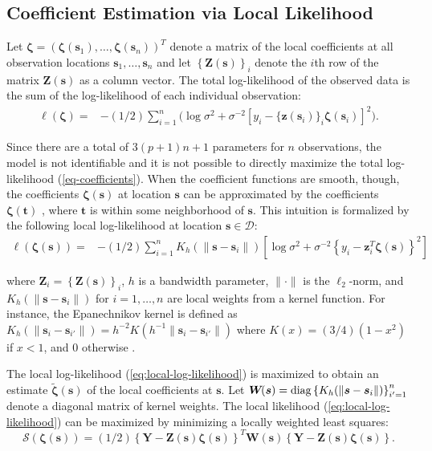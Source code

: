 \documentclass[authoryear,review, 12pt]{elsarticle}
\begin{document}
\subsection{Coefficient Estimation via Local Likelihood}




Let $\bm{\zeta}=\left(\bm{\zeta}(\bm{s}_{1}),\dots,\bm{\zeta}(\bm{s}_{n})\right)^{T}$
denote a matrix of the local coefficients at all observation locations
$\bm{s}_{1},\dots,\bm{s}_{n}$ and let $\left\{\bm{Z}(\bm{s})\right\}_{i}$ denote the
$i$th row of the matrix $\bm{Z}(\bm{s})$ as a column vector. The total log-likelihood of the observed
data is the sum of the log-likelihood of each individual observation:
\begin{align}
\ell\left(\bm{\zeta}\right)= & -(1/2)\sum_{i=1}^{n}\big( \log{\sigma^{2}}+\sigma^{-2} \left[ y_{i} - \{\bm{z}(\bm{s}_i)\}_i \bm{\zeta}(\bm{s}_{i}) \right] ^{2} \big).\label{eq-coefficients}
\end{align}

Since there are a total of $3(p+1)n+1$ parameters for $n$ observations,
the model is not identifiable and it is not possible to directly maximize
the total log-likelihood (\ref{eq-coefficients}). When the coefficient functions are smooth, though,
the coefficients $\bm{\zeta}(\bm{s})$ at location $\bm{s}$ can be
approximated by the coefficients $\bm{\zeta}(\bm{t})$ , where $\bm{t}$
is within some neighborhood of $\bm{s}$. This intuition is formalized
by the following local log-likelihood at location $\bm{s}\in\mathcal{D}$:
\begin{align}
\ell\left(\bm{\zeta}(\bm{s})\right)= & -(1/2)\sum_{i=1}^{n}K_{h}(\|\bm{s}-\bm{s}_{i}\|)\left[\log\sigma^{2}+\sigma^{-2}\left\{ y_{i}-\bm{z}_{i}^{T}\bm{\zeta}(\bm{s})\right\} ^{2}\right]\label{eq:local-log-likelihood}
\end{align}

where $\bm{Z}_{i}=\left\{\bm{Z}(\bm{s})\right\}_{i}$, $h$ is a bandwidth parameter, $\|\cdot\|$ is the $\ell_{2}$-norm,
and $K_{h}(\|\bm{s}-\bm{s}_{i}\|)$ for $i=1,\dots,n$ are local weights
from a kernel function. For instance, the Epanechnikov kernel is defined
as $K_{h}(\|\bm{s}_{i}-\bm{s}_{i'}\|)=h^{-2}K\left(h^{-1}\|\bm{s}_{i}-\bm{s}_{i'}\|\right)$
where $K(x)=(3/4)(1-x^{2})$ if $x<1$, and $0$ otherwise \citep{Samiuddin-el-Sayyad-1990}.

The local log-likelihood (\ref{eq:local-log-likelihood}) is maximized
to obtain an estimate $\tilde{\bm{\zeta}}(\bm{s})$ of the local coefficients
at $\bm{s}$. Let $\bm{W}\!(\bm{s})={\rm diag}\left\{ K_{h}(\|\bm{s}-\bm{s}_{i}\|)\right\} _{i'=1}^{n}$
denote a diagonal matrix of kernel weights. The local likelihood (\ref{eq:local-log-likelihood})
can be maximized by minimizing a locally weighted least squares: 
\begin{equation}
\mathcal{S}\left(\bm{\zeta}(\bm{s})\right)=(1/2)\left\{ \bm{Y}-\bm{Z}(\bm{s})\bm{\zeta}(\bm{s})\right\} ^{T}\bm{W}\!(\bm{s})\left\{ \bm{Y}-\bm{Z}(\bm{s})\bm{\zeta}(\bm{s})\right\} .\label{eq:local-sum-of-squares}
\end{equation}
\end{document}
